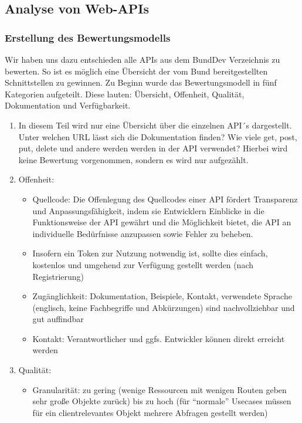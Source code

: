 \documentclass[notitlepage, hidelinks]{article}
\begin{document}
\newpage
\subsection{Analyse von Web-APIs}

\subsubsection{Erstellung des Bewertungsmodells}

Wir haben uns dazu entschieden alle APIs aus dem BundDev Verzeichnis zu bewerten. So ist es möglich eine Übersicht der vom Bund bereitgestellten Schnittstellen zu gewinnen. Zu Beginn wurde das Bewertungsmodell in fünf Kategorien aufgeteilt. Diese lauten: Übersicht, Offenheit, Qualität, Dokumentation und Verfügbarkeit.

\begin{enumerate}
\item In diesem Teil wird nur eine Übersicht über die einzelnen API´s dargestellt. Unter welchen URL lässt sich die Dokumentation finden? Wie viele get, post, put, delete und andere werden werden in der API verwendet? Hierbei wird keine Bewertung vorgenommen, sondern es wird nur aufgezählt.
\item Offenheit: 
\begin{itemize}
\item Quellcode: Die Offenlegung des Quellcodes einer API fördert Transparenz und Anpassungsfähigkeit, indem sie Entwicklern Einblicke in die Funktionsweise der API gewährt und die Möglichkeit bietet, die API an individuelle Bedürfnisse anzupassen sowie Fehler zu beheben.
\item Insofern ein Token zur Nutzung notwendig ist, sollte dies einfach, kostenlos und umgehend zur Verfügung gestellt werden (nach Registrierung)
\item Zugänglichkeit: Dokumentation, Beispiele, Kontakt, verwendete Sprache (englisch, keine Fachbegriffe und Abkürzungen) sind nachvollziehbar und gut auffindbar
\item Kontakt: Verantwortlicher und ggfs. Entwickler können direkt erreicht werden
\end{itemize}
\item Qualität: 
\begin{itemize}
\item Granularität: zu gering (wenige Ressourcen mit wenigen Routen geben sehr große Objekte zurück) bis zu hoch (für ``normale'' Usecases müssen für ein clientrelevantes Objekt mehrere Abfragen gestellt werden)

\end{itemize}
\end{enumerate}
\end{document}
